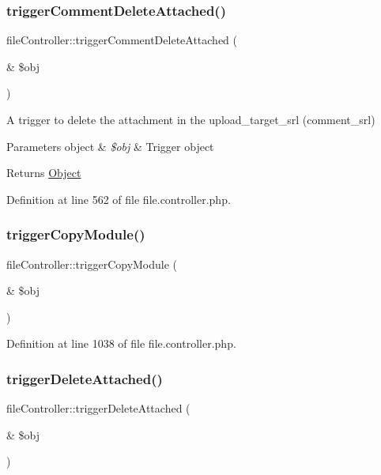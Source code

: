 \subsubsection{\texorpdfstring{trigger\+Comment\+Delete\+Attached()}{triggerCommentDeleteAttached()}}
{\footnotesize\ttfamily file\+Controller\+::trigger\+Comment\+Delete\+Attached (\begin{DoxyParamCaption}\item[{\&}]{\$obj }\end{DoxyParamCaption})}

A trigger to delete the attachment in the upload\+\_\+target\+\_\+srl (comment\+\_\+srl)


\begin{DoxyParams}[1]{Parameters}
object & {\em \$obj} & Trigger object \\
\hline
\end{DoxyParams}
\begin{DoxyReturn}{Returns}
\hyperlink{classObject}{Object} 
\end{DoxyReturn}


Definition at line 562 of file file.\+controller.\+php.

\mbox{\label{classfileController_a043759003f14e91db0f4fb554955fba8}} 
\subsubsection{\texorpdfstring{trigger\+Copy\+Module()}{triggerCopyModule()}}
{\footnotesize\ttfamily file\+Controller\+::trigger\+Copy\+Module (\begin{DoxyParamCaption}\item[{\&}]{\$obj }\end{DoxyParamCaption})}



Definition at line 1038 of file file.\+controller.\+php.

\mbox{\label{classfileController_aaa8d73e09e5aa3a5a6807dffb578d84c}} 
\subsubsection{\texorpdfstring{trigger\+Delete\+Attached()}{triggerDeleteAttached()}}
{\footnotesize\ttfamily file\+Controller\+::trigger\+Delete\+Attached (\begin{DoxyParamCaption}\item[{\&}]{\$obj }\end{DoxyParamCaption})}

